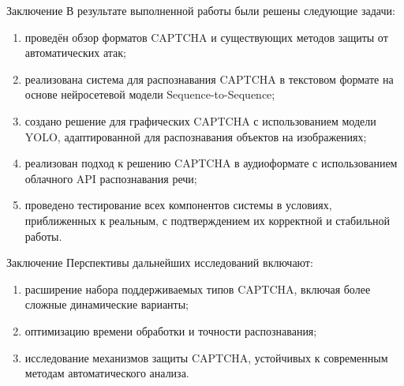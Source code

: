 \documentclass[12pt,a4paper,mathserif]{beamer}
\begin{document}
\begin{frame}{Заключение}
    \setlength{\parindent}{0.5cm}
    В результате выполненной работы были решены следующие задачи:

    \begin{enumerate}
        \item проведён обзор форматов CAPTCHA и существующих методов защиты от 
        автоматических атак;
        \item реализована система для распознавания CAPTCHA в текстовом формате 
        на основе нейросетевой модели Sequence-to-Sequence;
        \item создано решение для графических CAPTCHA с использованием модели 
        YOLO, адаптированной для распознавания объектов на изображениях;
        \item реализован подход к решению CAPTCHA в аудиоформате с использованием 
        облачного API распознавания речи;
        \item проведено тестирование всех компонентов системы в условиях, 
        приближенных к реальным, с подтверждением их корректной и стабильной 
        работы.
    \end{enumerate}
\end{frame}

\begin{frame}{Заключение}
    \setlength{\parindent}{0.5cm}
    Перспективы дальнейших исследований включают:

    \begin{enumerate}
        \item расширение набора поддерживаемых типов CAPTCHA, включая более 
        сложные динамические варианты;
        \item оптимизацию времени обработки и точности распознавания;
        \item исследование механизмов защиты CAPTCHA, устойчивых к современным 
        методам автоматического анализа.
    \end{enumerate}
\end{frame}
\end{document}
